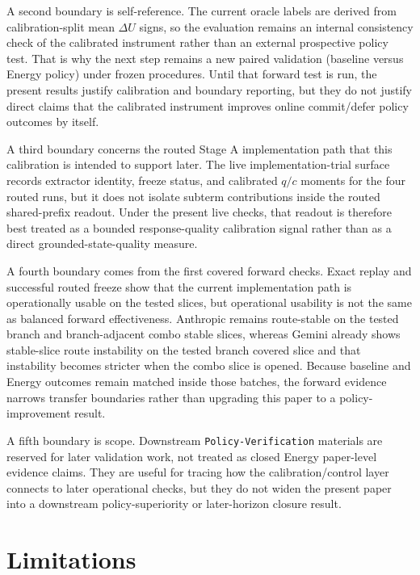 \documentclass[11pt,a4paper]{article}
\begin{document}
A second boundary is self-reference. The current oracle labels are derived from calibration-split mean $\Delta U$ signs, so the evaluation remains an internal consistency check of the calibrated instrument rather than an external prospective policy test. That is why the next step remains a new paired validation (baseline versus Energy policy) under frozen procedures. Until that forward test is run, the present results justify calibration and boundary reporting, but they do not justify direct claims that the calibrated instrument improves online commit/defer policy outcomes by itself.

A third boundary concerns the routed Stage A implementation path that this
calibration is intended to support later. The live implementation-trial
surface records extractor identity, freeze status, and calibrated \(q/c\)
moments for the four routed runs, but it does not isolate subterm
contributions inside the routed shared-prefix readout. Under the present live
checks, that readout is therefore best treated as a bounded response-quality
calibration signal rather than as a direct grounded-state-quality measure.

A fourth boundary comes from the first covered forward checks. Exact replay and successful routed freeze show that the current implementation path is operationally usable on the tested slices, but operational usability is not the same as balanced forward effectiveness. Anthropic remains route-stable on the tested branch and branch-adjacent combo stable slices, whereas Gemini already shows stable-slice route instability on the tested branch covered slice and that instability becomes stricter when the combo slice is opened. Because baseline and Energy outcomes remain matched inside those batches, the forward evidence narrows transfer boundaries rather than upgrading this paper to a policy-improvement result.

A fifth boundary is scope. Downstream \texttt{Policy-Verification} materials
are reserved for later validation work, not treated as closed Energy
paper-level evidence claims. They are useful for tracing how the
calibration/control layer connects to later operational checks, but they do not
widen the present paper into a downstream policy-superiority or later-horizon
closure result.

\section{Limitations}
\label{sec:limitations}
\end{document}
